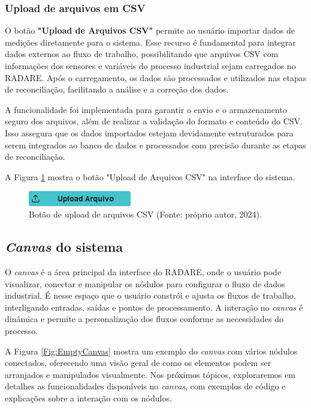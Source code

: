 \subsubsection{Upload de arquivos em CSV}

O botão \textbf{"Upload de Arquivos CSV"} permite ao usuário importar dados de medições diretamente para o sistema. Esse recurso é fundamental para integrar dados externos ao fluxo de trabalho, possibilitando que arquivos CSV com informações dos sensores e variáveis do processo industrial sejam carregados no RADARE. Após o carregamento, os dados são processados e utilizados nas etapas de reconciliação, facilitando a análise e a correção dos dados.

A funcionalidade foi implementada para garantir o envio e o armazenamento seguro dos arquivos, além de realizar a validação do formato e conteúdo do CSV. Isso assegura que os dados importados estejam devidamente estruturados para serem integrados ao banco de dados e processados com precisão durante as etapas de reconciliação.

A Figura \ref{Fig:UploadCSVButton} mostra o botão "Upload de Arquivos CSV" na interface do sistema.

\begin{figure}[htbp]
    \centering
    \includegraphics[width=0.4\textwidth]{figuras/upload-csv-button.png}
    \caption{Botão de upload de arquivos CSV (Fonte: próprio autor, 2024).}
    \label{Fig:UploadCSVButton}
\end{figure}

\subsection{\textit{Canvas} do sistema}

O \textit{canvas} é a área principal da interface do RADARE, onde o usuário pode visualizar, conectar e manipular os nódulos para configurar o fluxo de dados industrial. É nesse espaço que o usuário constrói e ajusta os fluxos de trabalho, interligando entradas, saídas e pontos de processamento. A interação no \textit{canvas} é dinâmica e permite a personalização dos fluxos conforme as necessidades do processo.

A Figura \ref{Fig:EmptyCanvas} mostra um exemplo do \textit{canvas} com vários nódulos conectados, oferecendo uma visão geral de como os elementos podem ser arranjados e manipulados visualmente. Nos próximos tópicos, exploraremos em detalhes as funcionalidades disponíveis no \textit{canvas}, com exemplos de código e explicações sobre a interação com os nódulos.

